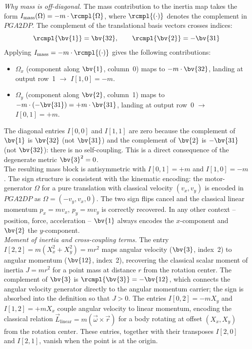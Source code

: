 \emph{Why mass is off-diagonal.} The mass contribution to the inertia map takes the form
$I_\mathrm{mass}(\Omega) = -m \cdot \rcmpl{\Omega}$, where $\rcmpl{(\cdot)}$ denotes the
complement in $PGA2DP$. The complement of the translational basis vectors crosses indices:
\begin{equation}
    \rcmpl{\bv{1}} = \bv{32}, \qquad \rcmpl{\bv{2}} = -\bv{31}
    \label{eq:dual_pga2dp}
\end{equation}
Applying $I_\mathrm{mass} = -m \cdot \rcmpl{(\cdot)}$ gives the following contributions:
\begin{itemize}
    \item $\Omega_x$ (component along $\bv{1}$, column~0) maps to $-m \cdot \bv{32}$,
    landing at output row~1 $\rightarrow$ $I[1,0] = -m$.
    \item $\Omega_y$ (component along $\bv{2}$, column~1) maps to $-m \cdot (-\bv{31})
    = +m \cdot \bv{31}$, landing at output row~0 $\rightarrow$ $I[0,1] = +m$.
\end{itemize}
The diagonal entries $I[0,0]$ and $I[1,1]$ are zero because the complement of $\bv{1}$ is
$\bv{32}$ (not $\bv{31}$) and the complement of $\bv{2}$ is $-\bv{31}$ (not $\bv{32}$):
there is no self-coupling. This is a direct consequence of the degenerate metric $\bv{3}^2
= 0$. \\

The resulting mass block is antisymmetric with $I[0,1] = +m$ and $I[1,0] = -m$. The sign
structure is consistent with the kinematic encoding: the motor-generator $\Omega$ for a
pure translation with classical velocity $(v_x, v_y)$ is encoded in $PGA2DP$ as $\Omega =
(-v_y, v_x, 0)$. The two sign flips cancel and the classical linear momentum $p_x = mv_x$,
$p_y = mv_y$ is correctly recovered. In any other context -- position, force, acceleration
-- $\bv{1}$ always encodes the $x$-component and $\bv{2}$ the $y$-component. \\

\emph{Moment of inertia and cross-coupling terms.} The entry $I[2,2] = m(X_x^2 + X_y^2) =
mr^2$ maps angular velocity ($\bv{3}$, index~2) to angular momentum ($\bv{12}$, index~2),
recovering the classical scalar moment of inertia $J = mr^2$ for a point mass at distance
$r$ from the rotation center. The complement of $\bv{3}$ is $\rcmpl{\bv{3}} = -\bv{12}$,
which connects the angular velocity generator directly to the angular momentum carrier;
the sign is absorbed into the definition so that $J > 0$. The entries $I[0,2] = -mX_y$ and
$I[1,2] = +mX_x$ couple angular velocity to linear momentum, encoding the classical
relation $\vec{L}_\mathrm{linear} = m(\vec{\omega} \times \vec{r})$ for a body rotating at
offset $(X_x, X_y)$ from the rotation center. These entries, together with their
transposes $I[2,0]$ and $I[2,1]$, vanish when the point is at the origin. \\

